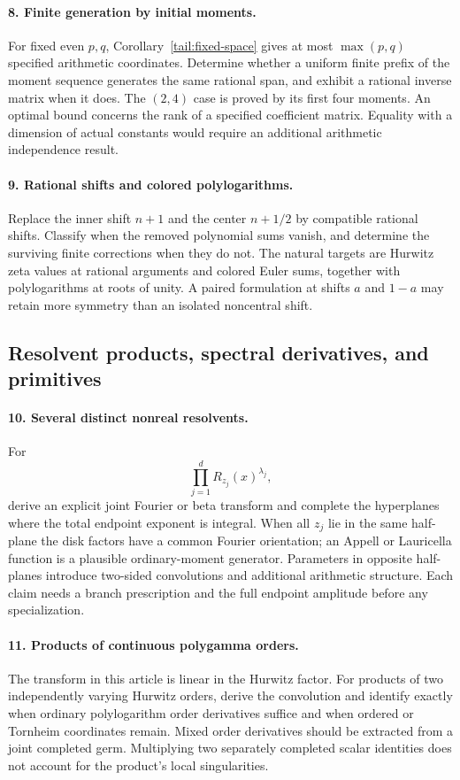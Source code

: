 \paragraph{8. Finite generation by initial moments.}
For fixed even $p,q$, Corollary~\ref{tail:fixed-space} gives at
most $\max(p,q)$ specified arithmetic coordinates. Determine
whether a uniform finite prefix of the moment sequence generates
the same rational span, and exhibit a rational inverse matrix when
it does. The $(2,4)$ case is proved by its first four moments.
An optimal bound concerns the rank of a specified coefficient
matrix. Equality with a dimension of actual constants would require
an additional arithmetic independence result.

\paragraph{9. Rational shifts and colored polylogarithms.}
Replace the inner shift $n+1$ and the center $n+1/2$ by compatible
rational shifts. Classify when the removed polynomial sums vanish,
and determine the surviving finite corrections when they do not.
The natural targets are Hurwitz zeta values at rational arguments
and colored Euler sums, together with polylogarithms at roots of
unity. A paired formulation at shifts $a$ and $1-a$ may retain
more symmetry than an isolated noncentral shift.

\subsection{Resolvent products, spectral derivatives, and primitives}

\paragraph{10. Several distinct nonreal resolvents.}
For
\[
\prod_{j=1}^d R_{z_j}(x)^{\lambda_j},
\]
derive an explicit joint Fourier or beta transform and complete
the hyperplanes where the total endpoint exponent is integral.
When all $z_j$ lie in the same half-plane the disk factors have
a common Fourier orientation; an Appell or Lauricella function
is a plausible ordinary-moment generator. Parameters in opposite
half-planes introduce two-sided convolutions and additional
arithmetic structure. Each claim needs a branch prescription and
the full endpoint amplitude before any specialization.

\paragraph{11. Products of continuous polygamma orders.}
The transform in this article is linear in the Hurwitz factor.
For products of two independently varying Hurwitz orders, derive
the convolution and identify exactly when ordinary polylogarithm
order derivatives suffice and when ordered or Tornheim coordinates
remain. Mixed order derivatives should be extracted from a joint
completed germ. Multiplying two separately completed scalar
identities does not account for the product's local singularities.

